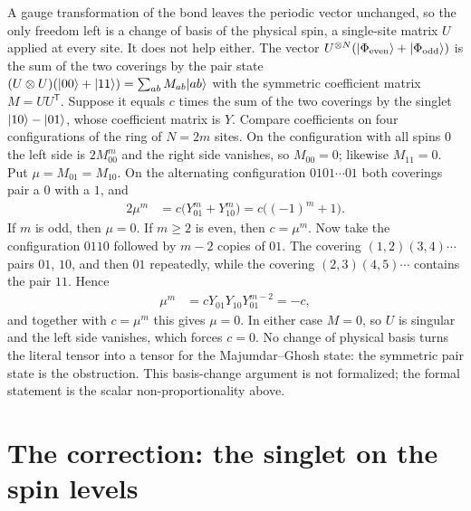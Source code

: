 \documentclass{article}
\begin{document}
A gauge transformation of the bond leaves the periodic vector unchanged, so the
only freedom left is a change of basis of the physical spin, a single-site
matrix $U$ applied at every site. It does not help either. The vector
$U^{\otimes N}(|\Phi_{\mathrm{even}}\rangle+|\Phi_{\mathrm{odd}}\rangle)$ is the sum
of the two coverings by the pair state
$(U\otimes U)(|00\rangle+|11\rangle)=\sum_{ab}M_{ab}|ab\rangle$ with the symmetric
coefficient matrix $M=UU^{\mathsf T}$. Suppose it equals $c$ times the sum of the
two coverings by the singlet $|10\rangle-|01\rangle$, whose coefficient matrix is
$Y$. Compare coefficients on four configurations of the ring of $N=2m$ sites.
On the configuration with all spins $0$ the left side is $2M_{00}^m$ and the
right side vanishes, so $M_{00}=0$; likewise $M_{11}=0$. Put
$\mu=M_{01}=M_{10}$. On the alternating configuration $0101\cdots01$ both
coverings pair a $0$ with a $1$, and
\begin{align}
    2\mu^m
        &=
        c\bigl(Y_{01}^m+Y_{10}^m\bigr)
        =
        c\bigl((-1)^m+1\bigr).
    \label{eq:rmp_majumdar_ghosh_tensor_gap_alternating}
\end{align}
If $m$ is odd, then $\mu=0$. If $m\geq2$ is even, then $c=\mu^m$. Now take
the configuration $0110$ followed by $m-2$ copies of $01$. The covering
$(1,2)(3,4)\cdots$ pairs $01$, $10$, and then $01$ repeatedly, while the
covering $(2,3)(4,5)\cdots$ contains the pair $11$. Hence
\begin{align}
    \mu^m
        &=
        cY_{01}Y_{10}Y_{01}^{m-2}
        =
        -c,
    \label{eq:rmp_majumdar_ghosh_tensor_gap_shifted}
\end{align}
and together with $c=\mu^m$ this gives $\mu=0$. In either case $M=0$, so
$U$ is singular and the left side
vanishes, which forces $c=0$. No change of physical basis turns the literal
tensor into a tensor for the Majumdar--Ghosh state: the symmetric pair state is
the obstruction. This basis-change argument is not formalized; the formal
statement is the scalar non-proportionality above.

\section{The correction: the singlet on the spin levels}
\end{document}
